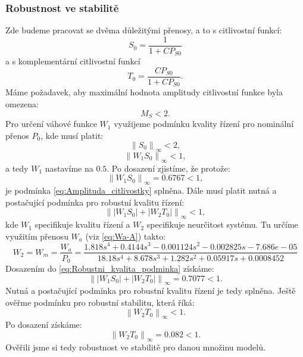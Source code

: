 \documentclass[a4paper,11pt]{article}
\begin{document}
\newpage
\subsubsection{Robustnost ve stabilitě}
Zde budeme pracovat se dvěma důležitými přenosy, a to s citlivostní funkcí:
\begin{equation}
S_{0}=\frac{1}{1+CP_{S0}}
\end{equation}
a s komplementární citlivostní funkcí
\begin{equation}
T_{0}=\frac{CP_{S0}}{1+CP_{S0}}.
\end{equation}
Máme požadavek, aby maximální hodnota amplitudy citlivostní funkce byla omezena:
\begin{equation}\label{eq:Amplituda_citlivostky} 
M_{S}<2.
\end{equation}
Pro určení váhové funkce $ W_{1} $ využijeme podmínku kvality řízení pro nominální přenos $ P_{0} $, kde musí platit:
\begin{equation}
\left \| S_{0} \right \|_{\infty }<2,
\end{equation}
\begin{equation}
\left \| W_{1}S_{0} \right \|_{\infty }<1,
\end{equation}
a tedy $  W_{1} $ nastavíme na $ 0.5 $. Po dosazení zjistíme, že protože:
\begin{equation}
\left \| W_{1}S_{0} \right \|_{\infty }=0.6767<1,
\end{equation}
je podmínka \ref{eq:Amplituda_citlivostky} splněna.
Dále musí platit nutná a postačující podmínka pro robustní kvalitu řízení:
\begin{equation}\label{eq:Robustni_kvalita_podminka} 
\left \| \left | W_{1}S_{0} \right |+ \left | W_{2}T_{0} \right |\right \|_{\infty }< 1,
\end{equation}
kde $  W_{1} $ specifikuje kvalitu řízení a $  W_{2} $ specifikuje neurčitost systému. Tu určíme využitím přenosu $  W_{a} $ (viz \ref{eq:Wa-A}) takto:
\begin{equation}\label{eq:Wm=Wa/P0} 
W_{2}=W_{m}=\frac{W_{a}}{P_{0}}=\frac{1.818 s^{4} + 0.4144 s^{3} - 0.001124 s^{2} - 0.002825 s - 7.686e-05}{18.18 s^{4} + 8.678 s^{3} + 1.282 s^{2} + 0.05917 s + 0.0008452}
\end{equation}
Dosazením do \ref{eq:Robustni_kvalita_podminka} získáme:
\begin{equation} 
\left \| \left | W_{1}S_{0} \right |+ \left | W_{2}T_{0} \right |\right \|_{\infty }= 0.7077 <1.
\end{equation}
Nutná a postačující podmínka pro robustní kvalitu řízení je tedy splněna. Ještě ověřme podmínku pro robustní stabilitu, která říká:
\begin{equation} 
\left \| W_{2}T_{0}\right \|_{\infty }<1.
\end{equation}
Po dosazení získáme:
\begin{equation} 
\left \| W_{2}T_{0}\right \|_{\infty }=0.082<1.
\end{equation}
Ověřili jsme si tedy robustnost ve stabilitě pro danou množinu modelů.
\end{document}
